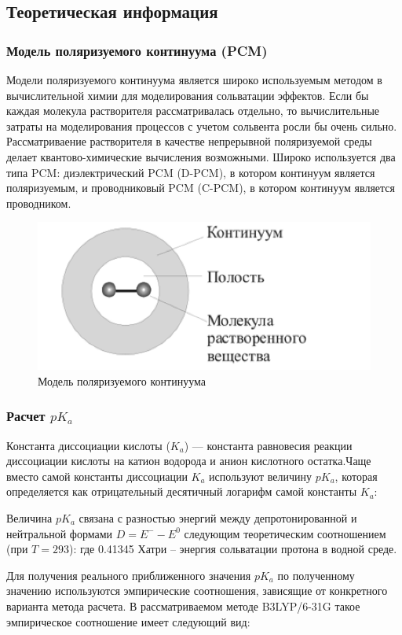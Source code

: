 \subsection{Теоретическая информация}
\subsubsection{Модель поляризуемого континуума (PCM)}
Модели поляризуемого континуума является широко используемым методом в вычислительной химии для моделирования сольватации эффектов. Если бы каждая молекула растворителя рассматривалась отдельно, то вычислительные затраты на моделирования процессов с учетом сольвента росли бы очень сильно. Рассматриваение растворителя в качестве непрерывной поляризуемой среды делает квантово-химические вычисления возможными. Широко используется два типа PCM: диэлектрический PCM (D-PCM), в котором континуум является поляризуемым, и проводниковый PCM (C-PCM), в котором континуум является проводником. 

\begin{figure}[H]
\centering
\captionsetup{justification=centering}
\includegraphics[scale=1.0]{fig/1.jpg}
\caption{Модель поляризуемого континуума}
\end{figure}


\subsubsection{Расчет $pK_a$}
Константа диссоциации кислоты ($K_a$) — константа равновесия реакции диссоциации кислоты на катион водорода и анион кислотного остатка.Чаще вместо самой константы диссоциации $K_a$ используют величину $pK_a$, которая определяется как отрицательный десятичный логарифм самой константы $K_a$:

Величина $pK_a$ связана с разностью энергий между депротонированной и нейтральной формами $D = E^{-} - E^{0}$ следующим теоретическим соотношением (при $T = 293$):
где 0.41345 Хатри – энергия сольватации протона в водной среде. 

Для получения реального приближенного значения $pK_a$ по полученному значению   используются эмпирические соотношения, зависящие от конкретного варианта метода расчета. В рассматриваемом методе B3LYP/6-31G такое эмпирическое соотношение имеет следующий вид:
 	
